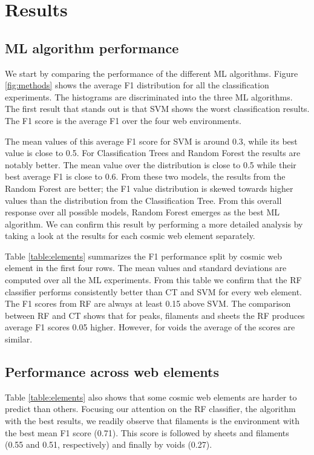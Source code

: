 \documentclass[usenatbib]{mnras}
\begin{document}
\section{Results}\label{sec:results}


\subsection{ML algorithm performance}


We start by comparing the performance of the different ML algorithms.
Figure \ref{fig:methods} shows the average F1 distribution for
all the classification experiments. 
The histograms are discriminated into the three ML algorithms.
The first result that stands out is that SVM shows the worst
classification results.
The F1 score is the average F1 over the four web environments.

The mean values of this average F1 score for SVM is around 0.3, while its best
value is close to 0.5.
For Classification Trees and Random Forest the results are notably better. 
The mean value over the distribution is close to 0.5 while their best
average F1 is close to 0.6.
From these two models, the results from the Random Forest are
better; the F1 value distribution is skewed towards higher values than
the distribution from the Classification Tree.
From this overall response over all possible models, Random Forest
emerges as the best ML algorithm.
We can confirm this result by performing a more detailed analysis by
taking a look at the results for each cosmic web element separately.


Table \ref{table:elements} summarizes the F1 performance split by cosmic
web element in the first four rows.
The mean values and standard deviations are computed over all the ML
experiments. 
From this table we confirm that the RF classifier performs
consistently better than CT and SVM for every web element.
The F1 scores from RF are always at least 0.15 above SVM.
The comparison between RF and CT shows that for peaks, filaments and
sheets the RF produces average F1 scores 0.05 higher. 
However, for voids the average of the scores are similar. 

\subsection{Performance across web elements}

Table \ref{table:elements} also shows that some cosmic web elements 
are harder to predict than others.
Focusing our attention on the RF classifier, the algorithm with the
best results,  we readily observe that filaments is the environment
with the best mean F1 score (0.71).
This score is followed by sheets and filaments (0.55 and 0.51,
respectively) and finally by voids (0.27). 
\end{document}
